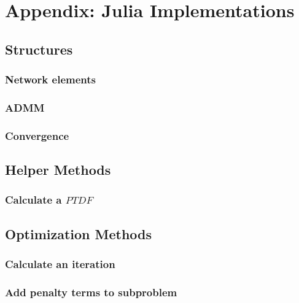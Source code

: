 \appendix				
\section{Appendix: Julia Implementations}

\subsection{Structures}

\subsubsection{Network elements}
\label{sec:appendix:jl:structures:ne}



\subsubsection{ADMM}
\label{sec:appendix:jl:structures:admm}



\subsubsection{Convergence}
\label{sec:appendix:jl:structures:convergence}



\subsection{Helper Methods}

\subsubsection{Calculate a $PTDF$}
\label{sec:appendix:jl:helpers:ptdf}



\subsection{Optimization Methods}

\subsubsection{Calculate an iteration}
\label{sec:appendix:jl:optimization:calculate-iteration}



\subsubsection{Add penalty terms to subproblem}
\label{sec:appendix:jl:optimization:add-penalty-terms}




